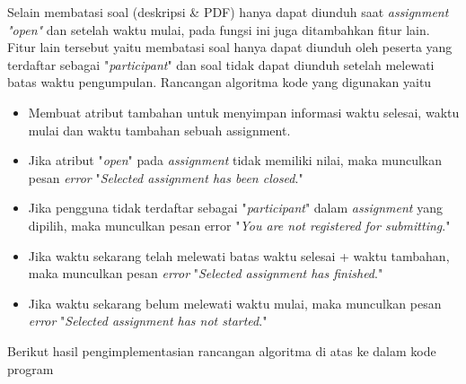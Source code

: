 Selain membatasi soal (deskripsi \& PDF) hanya dapat diunduh saat \textit{assignment "open"} dan setelah waktu mulai, pada fungsi ini juga ditambahkan fitur lain. Fitur lain tersebut yaitu membatasi soal hanya dapat diunduh oleh peserta yang terdaftar sebagai "\textit{participant}" dan soal tidak dapat diunduh setelah melewati batas waktu pengumpulan. Rancangan algoritma kode yang digunakan yaitu
\begin{itemize}
	\item Membuat atribut tambahan untuk menyimpan informasi waktu selesai, waktu mulai dan waktu tambahan sebuah assignment.
	\item Jika atribut "\textit{open}" pada \textit{assignment} tidak memiliki nilai, maka munculkan pesan \textit{error} "\textit{Selected assignment has been closed}."
	\item Jika pengguna tidak terdaftar sebagai "\textit{participant}" dalam \textit{assignment} yang dipilih, maka munculkan pesan error "\textit{You are not registered for submitting}."
	\item Jika waktu sekarang telah melewati batas waktu selesai + waktu tambahan, maka munculkan pesan \textit{error} "\textit{Selected assignment has finished}."
	\item Jika waktu sekarang belum melewati waktu mulai, maka munculkan pesan \textit{error} "\textit{Selected assignment has not started}."	
\end{itemize}

Berikut hasil pengimplementasian rancangan algoritma di atas ke dalam kode program

